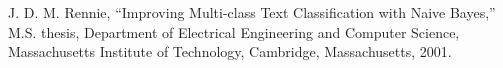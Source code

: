 \documentclass[conference]{IEEEtran}
\begin{document}
%




%
%
%
\begin{thebibliography}{1}

J. D. M. Rennie, ``Improving Multi-class Text Classification with Naive Bayes,'' M.S. thesis, Department of Electrical Engineering and Computer Science, Massachusetts Institute of Technology, Cambridge, Massachusetts, 2001. 

\end{thebibliography}




\end{document}
